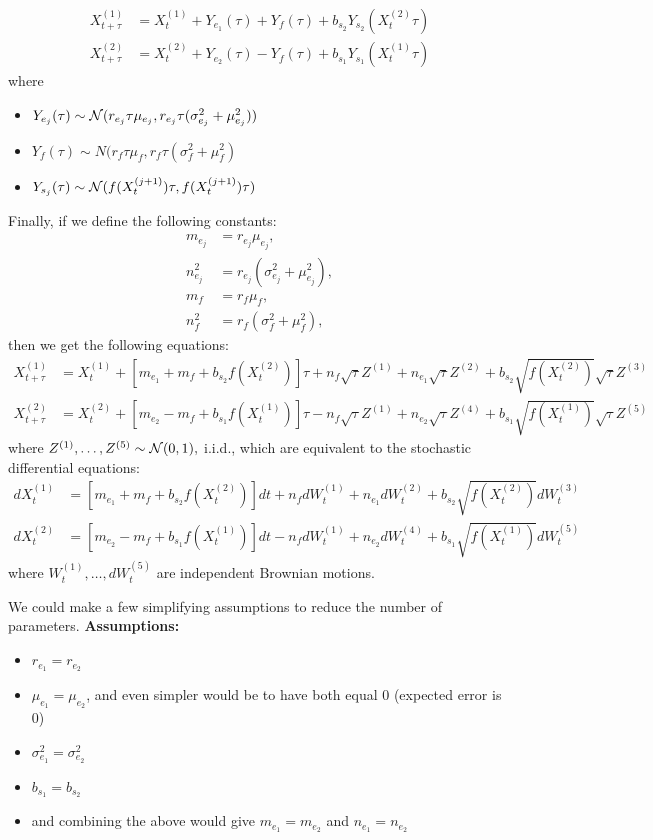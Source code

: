 \documentclass{article}
\begin{document}
\begin{align*}
X_{t+\tau}^{(1)}&=X_t^{(1)}+Y_{e_1}(\tau)+Y_f(\tau)+b_{s_2}Y_{s_2}(X_t^{(2)}\tau)
\\ X_{t+\tau}^{(2)}&=X_t^{(2)}+Y_{e_2}(\tau)-Y_f(\tau)+b_{s_1}Y_{s_1}(X_t^{(1)}\tau)
\end{align*}
where 
\begin{itemize}
\item $Y_{e_j}(\tau)\sim{\mathcal{ N}}(r_{e_j}\tau\mu_{e_j},r_{e_j}\tau(\sigma_{e_j}^2+\mu_{e_j}^2))$

\item $Y_f(\tau)\sim N(r_f\tau\mu_f,r_f\tau(\sigma^2_f+\mu_f^2)$

\item $Y_{s_j}(\tau)\sim{\mathcal{ N}}(f(X_t^{(j+1)})\tau,f(X_t^{(j+1)})\tau)$

\end{itemize}
Finally, if we define the following constants:
\begin{align*}
m_{e_j}&=r_{e_j}\mu_{e_j},
\\ n_{e_j}^2&=r_{e_j}(\sigma_{e_j}^2+\mu_{e_j}^2),
\\ m_f&=r_f\mu_f,
\\ n_f^2&=r_f(\sigma_f^2+\mu_f^2),
\end{align*}
then we get the following equations:
\begin{align*}
X_{t+\tau}^{(1)}&=X_t^{(1)}+\left[m_{e_1}+m_f+b_{s_2}f(X_t^{(2)})\right]\tau+n_f\sqrt{\tau}Z^{(1)}+n_{e_1}\sqrt{\tau}Z^{(2)}+b_{s_2}\sqrt{f(X_t^{(2)})}\sqrt{\tau}Z^{(3)}
\\ X_{t+\tau}^{(2)}&=X_t^{(2)}+\left[m_{e_2}-m_f+b_{s_1}f(X_t^{(1)})\right]\tau-n_f\sqrt{\tau}Z^{(1)}+n_{e_2}\sqrt{\tau}Z^{(4)}+b_{s_1}\sqrt{f(X_t^{(1)})}\sqrt{\tau}Z^{(5)}
\end{align*}
where $Z^{(1)},\dots,Z^{(5)}\sim {\mathcal{ N}}(0,1),$ i.i.d., which are equivalent to the stochastic differential equations:
\begin{align*}
dX_t^{(1)}&=\left[m_{e_1}+m_f+b_{s_2}f(X_t^{(2)})\right]dt+n_fdW_t^{(1)}+n_{e_1}dW_t^{(2)}+b_{s_2}\sqrt{f(X_t^{(2)})}dW_t^{(3)}
\\ dX_t^{(2)}&=\left[m_{e_2}-m_f+b_{s_1}f(X_t^{(1)})\right]dt-n_fdW_t^{(1)}+n_{e_2}dW_t^{(4)}+b_{s_1}\sqrt{f(X_t^{(1)})}dW_t^{(5)}
\end{align*}
where $W_t^{(1)},\dots,dW_t^{(5)}$ are independent Brownian motions.

We could make a few simplifying assumptions to reduce the number of parameters.  {\bf Assumptions:}
\begin{itemize}
\item $r_{e_1}=r_{e_2}$
\item $\mu_{e_1}=\mu_{e_2}$, and even simpler would be to have both equal $0$ (expected error is $0$)
\item $\sigma^2_{e_1}=\sigma^2_{e_2}$
\item $b_{s_1}=b_{s_2}$ 
\item and combining the above would give $m_{e_1}=m_{e_2}$ and $n_{e_1}=n_{e_2}$
\end{itemize}
\end{document}
